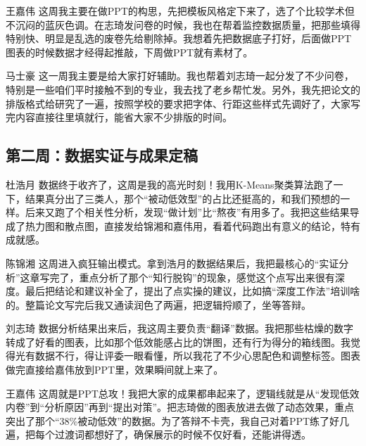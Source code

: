 \documentclass[win,thesis]{hustreport} %
\begin{document}
\begin{appendixblock}
\begin{cdkzero}{王嘉伟}
	这周我主要在做PPT的构思，先把模板风格定下来了，选了个比较学术但不沉闷的蓝灰色调。在志琦发问卷的时候，我也在帮着监控数据质量，把那些填得特别快、明显是乱选的废卷先给剔除掉。我想着先把数据底子打好，后面做PPT图表的时候数据才经得起推敲，下周做PPT就有素材了。
\end{cdkzero}

\begin{cdkzero}{马士豪}
	这一周我主要是给大家打好辅助。我也帮着刘志琦一起分发了不少问卷，特别是一些咱们平时接触不到的专业，我去找了老乡帮忙发。另外，我先把论文的排版格式给研究了一遍，按照学校的要求把字体、行距这些样式先调好了，大家写完内容直接往里填就行，能省大家不少排版的时间。
\end{cdkzero}

\subsection{第二周：数据实证与成果定稿}
\begin{cdkone}{杜浩月}
	数据终于收齐了，这周是我的高光时刻！我用K-Means聚类算法跑了一下，结果真分出了三类人，那个“被动低效型”的占比还挺高的，和我们预想的一样。后来又跑了个相关性分析，发现“做计划”比“熬夜”有用多了。我把这些结果导成了热力图和散点图，直接发给锦湘和嘉伟用，看着代码跑出有意义的结论，特有成就感。
\end{cdkone}

\begin{cdkone}{陈锦湘}
	这周进入疯狂输出模式。拿到浩月的数据结果后，我把最核心的“实证分析”这章写完了，重点分析了那个“知行脱钩”的现象，感觉这个点写出来很有深度。最后把结论和建议补全了，提出了点实操的建议，比如搞“深度工作法”培训啥的。整篇论文写完后我又通读润色了两遍，把逻辑捋顺了，坐等答辩。
\end{cdkone}

\begin{cdkone}{刘志琦}
	数据分析结果出来后，我这周主要负责“翻译”数据。我把那些枯燥的数字转成了好看的图表，比如那个低效能感占比的饼图，还有行为得分的箱线图。我觉得光有数据不行，得让评委一眼看懂，所以我花了不少心思配色和调整标签。图表做完直接给嘉伟放到PPT里，效果瞬间就上来了。
\end{cdkone}

\begin{cdkone}{王嘉伟}
	这周就是PPT总攻！我把大家的成果都串起来了，逻辑线就是从“发现低效内卷”到“分析原因”再到“提出对策”。把志琦做的图表放进去做了动态效果，重点突出了那个“38\%被动低效”的数据。为了答辩不卡壳，我自己对着PPT练了好几遍，把每个过渡词都想好了，确保展示的时候不仅好看，还能讲得透。
\end{cdkone}


\end{appendixblock}
\end{document}
